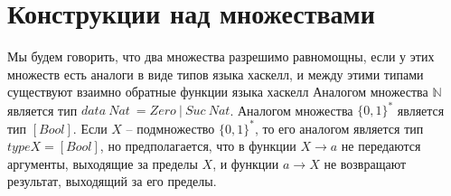 \section*{Конструкции над множествами}

\def\doubleunderline#1{\underline{\underline{#1}}}

Мы будем говорить, что два множества разрешимо равномощны, если у этих множеств есть аналоги в виде типов языка хаскелл,
    и между этими типами существуют взаимно обратные функции языка хаскелл
Аналогом множества $\mathbb{N}$ является тип $data\ Nat\ = Zero\ |\ Suc\ Nat$.
Аналогом множества $\{0,1\}^*$ является тип $[Bool]$.
Если $X$ -- подмножество $\{0,1\}^*$, то его аналогом является тип $type X = [Bool]$, но предполагается,
    что в функции $X \to a$ не передаются аргументы, выходящие за пределы $X$, и функции $a \to X$ не возвращают результат, выходящий за его пределы.

